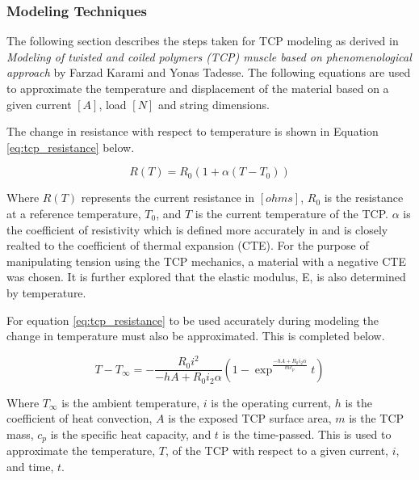 	\subsubsection{Modeling Techniques}
	\label{sect:aim1_modeling_techniques}
	
		The following section describes the steps taken for TCP modeling as derived in \textit{Modeling of twisted and coiled polymers (TCP) muscle based on phenomenological approach} by Farzad Karami and Yonas Tadesse. The following equations are used to approximate the temperature and displacement of the material based on a given current $[A]$, load $[N]$ and string dimensions.

		The change in resistance with respect to temperature is shown in Equation \ref{eq:tcp_resistance} below.
	
		\begin{equation}
		\label{eq:tcp_resistance}
			R(T) = R_{0} (1 + \alpha (T - T_{0}))
		\end{equation}
	
		Where $R(T)$ represents the current resistance in $[ohms]$, $R_{0}$ is the resistance at a reference temperature, $T_{0}$, and $T$ is the current temperature of the TCP. $\alpha$ is the coefficient of resistivity which is defined more accurately in \cite{yang_top-down_2016} and is closely realted to the coefficient of thermal expansion (CTE). For the purpose of manipulating tension using the TCP mechanics, a material with a negative CTE was chosen. It is further explored that the elastic modulus, E, is also determined by temperature.
	
		For equation \ref{eq:tcp_resistance} to be used accurately during modeling the change in temperature must also be approximated. This is completed below.
	
		\begin{equation}
		\label{eq:tcp_temperature}
			T - T_{\infty} =
				- \frac{R_{0} i^{2}}{-h A + R_{0} i_{2} \alpha}
				\left(
					1 -
					\exp^{\frac{-h A + R_{0} i_{2} \alpha}{m c_{p}}} t
				\right)
		\end{equation}
	
		Where $T_{\infty}$ is the ambient temperature, $i$ is the operating current, $h$ is the coefficient of heat convection, $A$ is the exposed TCP surface area, $m$ is the TCP mass, $c_{p}$ is the specific heat capacity, and $t$ is the time-passed. This is used to approximate the temperature, $T$, of the TCP with respect to a given current, $i$, and time, $t$.
	
